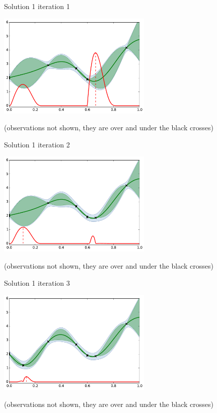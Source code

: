 \begin{frame}[noframenumbering]{Solution 1}
iteration 1
\begin{center}
\includegraphics[height=5cm]{4_optimization/figures/python/ego_EI1n1}
\end{center}
\tiny (observations not shown, they are over and under the black crosses)\\
\end{frame}

\begin{frame}[noframenumbering]{Solution 1}
iteration 2
\begin{center}
\includegraphics[height=5cm]{4_optimization/figures/python/ego_EI1n2}
\end{center}
\tiny (observations not shown, they are over and under the black crosses)\\
\end{frame}

\begin{frame}[noframenumbering]{Solution 1}
iteration 3
\begin{center}
\includegraphics[height=5cm]{4_optimization/figures/python/ego_EI1n3}
\end{center}
\tiny (observations not shown, they are over and under the black crosses)\\
\end{frame}

